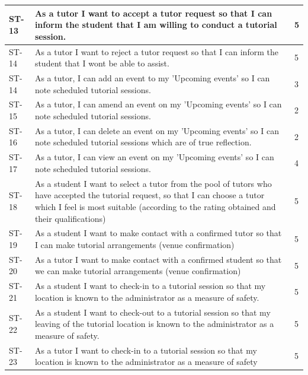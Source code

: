 \documentclass[12pt]{article}
\begin{document}
{\begin{longtable}{| l | p{10cm}| l |}
			\\ \hline ST-13 & As a tutor I want to accept a tutor request so that I can inform the student that I am willing to conduct a tutorial session. &5

						\\ \hline ST-14 & As a tutor I want to  reject a tutor request so that I can inform the student that I wont be able to assist.   & 5

			\\ \hline ST-14 & As a tutor, I can  add an event to my 'Upcoming events' so I can note scheduled tutorial sessions.  & 3

			\\ \hline ST-15 & As a tutor, I can  amend an event on my 'Upcoming events' so I can note scheduled tutorial sessions.  & 2

			\\ \hline ST-16 & As a tutor, I can  delete an event on my 'Upcoming events' so I can note scheduled tutorial sessions which are of true reflection. & 2

			\\ \hline ST-17 & As a tutor, I can  view an event on my 'Upcoming events'   so I can note scheduled tutorial sessions. & 4

			\\ \hline ST-18 & As a student I want to select a tutor from the pool of tutors who have accepted the tutorial request, so that I can choose a tutor which I feel is most suitable (according to the rating obtained and their qualifications)  &5

			\\ \hline ST-19 & As a student I want to make contact with a confirmed tutor so that I can make tutorial arrangements (venue confirmation) &5

			\\ \hline ST-20 &As a tutor I want to make contact with a confirmed student so that we can make tutorial arrangements (venue confirmation)  &5

			\\ \hline ST-21 & As a student I want to check-in to a tutorial session so that my location is known to the administrator as a measure of safety.  &5

			\\ \hline ST-22 & As a student I want to check-out to a tutorial session so that my leaving of the tutorial location is known to the administrator as a measure of safety.   &5

			\\ \hline ST-23 & As a tutor I want to check-in to a tutorial session so that my location is known to the administrator as a measure of safety  &5


\end{longtable}}
\end{document}
